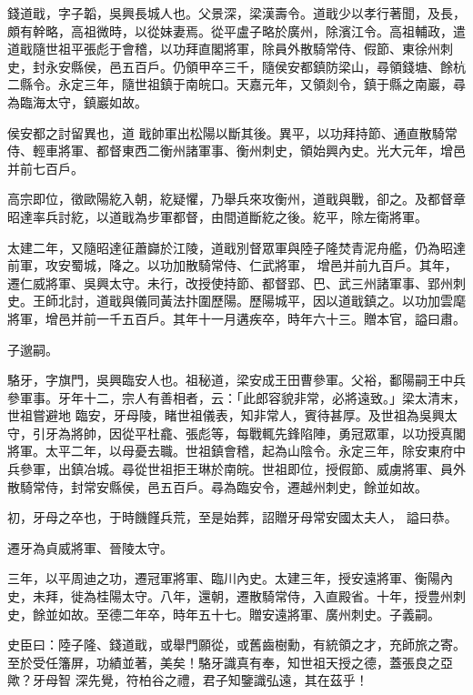 \begin{pinyinscope}
 錢道戢，字子韜，吳興長城人也。父景深，梁漢壽令。道戢少以孝行著聞，及長，頗有幹略，高祖微時，以從妹妻焉。從平盧子略於廣州，除濱江令。高祖輔政，遣道戢隨世祖平張彪于會稽，以功拜直閣將軍，除員外散騎常侍、假節、東徐州刺史，封永安縣侯，邑五百戶。仍領甲卒三千，隨侯安都鎮防梁山，尋領錢塘、餘杭二縣令。永定三年，隨世祖鎮于南皖口。天嘉元年，又領剡令，鎮于縣之南巖，尋為臨海太守，鎮巖如故。



 侯安都之討留異也，道
 戢帥軍出松陽以斷其後。異平，以功拜持節、通直散騎常侍、輕車將軍、都督東西二衡州諸軍事、衡州刺史，領始興內史。光大元年，增邑并前七百戶。



 高宗即位，徵歐陽紇入朝，紇疑懼，乃舉兵來攻衡州，道戢與戰，卻之。及都督章昭達率兵討紇，以道戢為步軍都督，由間道斷紇之後。紇平，除左衛將軍。



 太建二年，又隨昭達征蕭巋於江陵，道戢別督眾軍與陸子隆焚青泥舟艦，仍為昭達前軍，攻安蜀城，降之。以功加散騎常侍、仁武將軍，
 增邑并前九百戶。其年，遷仁威將軍、吳興太守。未行，改授使持節、都督郢、巴、武三州諸軍事、郢州刺史。王師北討，道戢與儀同黃法抃圍歷陽。歷陽城平，因以道戢鎮之。以功加雲麾將軍，增邑并前一千五百戶。其年十一月遘疾卒，時年六十三。贈本官，謚曰肅。



 子邈嗣。



 駱牙，字旗門，吳興臨安人也。祖秘道，梁安成王田曹參軍。父裕，鄱陽嗣王中兵參軍事。牙年十二，宗人有善相者，云：「此郎容貌非常，必將遠致。」梁太清末，世祖嘗避地
 臨安，牙母陵，睹世祖儀表，知非常人，賓待甚厚。及世祖為吳興太守，引牙為將帥，因從平杜龕、張彪等，每戰輒先鋒陷陣，勇冠眾軍，以功授真閣將軍。太平二年，以母憂去職。世祖鎮會稽，起為山陰令。永定三年，除安東府中兵參軍，出鎮冶城。尋從世祖拒王琳於南皖。世祖即位，授假節、威虜將軍、員外散騎常侍，封常安縣侯，邑五百戶。尋為臨安令，遷越州刺史，餘並如故。



 初，牙母之卒也，于時饑饉兵荒，至是始葬，詔贈牙母常安國太夫人，
 謚曰恭。



 遷牙為貞威將軍、晉陵太守。



 三年，以平周迪之功，遷冠軍將軍、臨川內史。太建三年，授安遠將軍、衡陽內史，未拜，徙為桂陽太守。八年，還朝，遷散騎常侍，入直殿省。十年，授豊州刺史，餘並如故。至德二年卒，時年五十七。贈安遠將軍、廣州刺史。子義嗣。



 史臣曰：陸子隆、錢道戢，或舉門願從，或舊齒樹勳，有統領之才，充師旅之寄。至於受任籓屏，功績並著，美矣！駱牙識真有奉，知世祖天授之德，蓋張良之亞歟？牙母智
 深先覺，符柏谷之禮，君子知鑒識弘遠，其在茲乎！



\end{pinyinscope}
